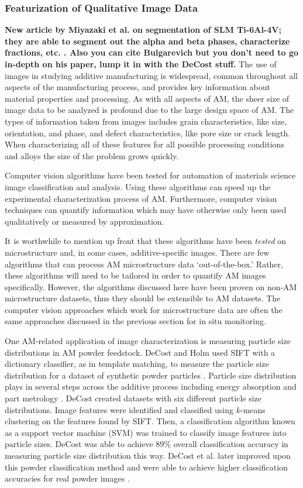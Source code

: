 \subsubsection{Featurization of Qualitative Image Data}

\textbf{New article by Miyazaki et al. on segmentation of SLM Ti-6Al-4V; they are able to segment out the alpha and beta phases, characterize fractions, etc. \cite{Miyazaki2019}. Also you can cite Bulgarevich \cite{Bulgarevich2018} but you don't need to go in-depth on his paper, lump it in with the DeCost stuff.}
The use of images in studying additive manufacturing is widespread, common throughout all aspects of the manufacturing process, and provides key information about material properties and processing. As with all aspects of AM, the sheer size of image data to be analyzed is profound due to the large design space of AM. The types of information taken from images includes grain characteristics, like size, orientation, and phase, and defect characteristics, like pore size or crack length. When characterizing all of these features for all possible processing conditions and alloys the size of the problem grows quickly.

Computer vision algorithms have been tested for automation of materials science image classification and analysis. Using these algorithms can speed up the experimental characterization process of AM. Furthermore, computer vision techniques can quantify information which may have otherwise only been used qualitatively or measured by approximation. 

It is worthwhile to mention up front that these algorithms have been \textit{tested} on microstructure and, in some cases, additive-specific images. There are few algorithms that can process AM microstructure data `out-of-the-box.' Rather, these algorithms will need to be tailored in order to quantify AM images specifically. However, the algorithms discussed here have been proven on non-AM microstructure datasets, thus they should be extensible to AM datasets. The computer vision approaches which work for microstructure data are often the same approaches discussed in the previous section for in situ monitoring. 

One AM-related application of image characterization is measuring particle size distributions in AM powder feedstock. DeCost and Holm used SIFT with a dictionary classifier, as in template matching, to measure the particle size distribution for a dataset of synthetic powder particles \cite{DeCost2017a}. Particle size distribution plays in several steps across the additive process including energy absorption and part metrology \cite{Zhou2009, Boley2015, Boley2016}. DeCost created datasets with six different particle size distributions. Image features were identified and classified using $k$-means clustering on the features found by SIFT. Then, a classification algorithm known as a support vector machine (SVM) was trained to classify image features into particle sizes. DeCost was able to achieve $89$\% overall classification accuracy in measuring particle size distribution this way. DeCost et al. later improved upon this powder classification method and were able to achieve higher classification accuracies for real powder images \cite{DeCost2017}.

